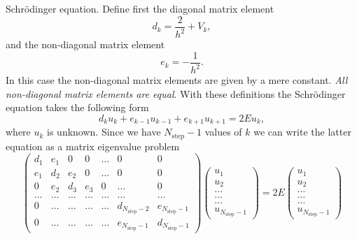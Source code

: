 Schr\"odinger equation.
Define first the diagonal matrix element
\[
   d_k=\frac{2}{h^2}+V_k,
\]
and the non-diagonal matrix element 
\[
   e_k=-\frac{1}{h^2}.
\]
In this case the non-diagonal matrix elements are given by a mere constant.
{\em All non-diagonal matrix elements are equal}.
With these definitions the Schr\"odinger equation takes the following form
\[
d_ku_k+e_{k-1}u_{k-1}+e_{k+1}u_{k+1}  = 2E u_k,
\]
where $u_k$ is unknown. Since we have $N_{\mathrm{step}}-1$ values of $k$ we can write the 
latter equation as a matrix eigenvalue problem 
\begin{equation}
    \left( \begin{array}{ccccccc} d_1 & e_1 & 0   & 0    & \dots  &0     & 0 \\
                                e_1 & d_2 & e_2 & 0    & \dots  &0     &0 \\
                                0   & e_2 & d_3 & e_3  &0       &\dots & 0\\
                                \dots  & \dots & \dots & \dots  &\dots      &\dots & \dots\\
                                0   & \dots & \dots & \dots  &\dots       &d_{N_{\mathrm{step}}-2} & e_{N_{\mathrm{step}}-1}\\
                                0   & \dots & \dots & \dots  &\dots       &e_{N_{\mathrm{step}}-1} & d_{N_{\mathrm{step}}-1}

             \end{array} \right)      \left( \begin{array}{c} u_{1} \\
                                                              u_{2} \\
                                                              \dots\\ \dots\\ \dots\\
                                                              u_{N_{\mathrm{step}}-1}
             \end{array} \right)=2E \left( \begin{array}{c} u_{1} \\
                                                              u_{2} \\
                                                              \dots\\ \dots\\ \dots\\
                                                              u_{N_{\mathrm{step}}-1}
             \end{array} \right) 
      \label{eq:sematrix}
\end{equation} 
